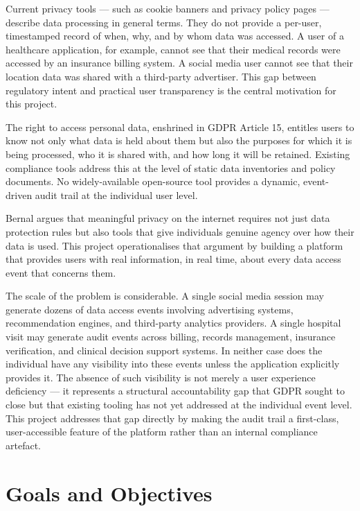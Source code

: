 \documentclass[a4paper,12pt,onecolumn]{report}
\begin{document}
Current privacy tools --- such as cookie banners and privacy policy pages --- describe data processing in general terms.
They do not provide a per-user, timestamped record of when, why, and by whom data was accessed.
A user of a healthcare application, for example, cannot see that their medical records were accessed by an insurance billing system.
A social media user cannot see that their location data was shared with a third-party advertiser.
This gap between regulatory intent and practical user transparency is the central motivation for this project.

The right to access personal data, enshrined in GDPR Article 15, entitles users to know not only what data is held about them but also the purposes for which it is being processed, who it is shared with, and how long it will be retained.
Existing compliance tools address this at the level of static data inventories and policy documents.
No widely-available open-source tool provides a dynamic, event-driven audit trail at the individual user level.

Bernal \cite{privacylaw} argues that meaningful privacy on the internet requires not just data protection rules but also tools that give individuals genuine agency over how their data is used.
This project operationalises that argument by building a platform that provides users with real information, in real time, about every data access event that concerns them.

The scale of the problem is considerable.
A single social media session may generate dozens of data access events involving advertising systems, recommendation engines, and third-party analytics providers.
A single hospital visit may generate audit events across billing, records management, insurance verification, and clinical decision support systems.
In neither case does the individual have any visibility into these events unless the application explicitly provides it.
The absence of such visibility is not merely a user experience deficiency --- it represents a structural accountability gap that GDPR sought to close but that existing tooling has not yet addressed at the individual event level.
This project addresses that gap directly by making the audit trail a first-class, user-accessible feature of the platform rather than an internal compliance artefact.

\section{Goals and Objectives}
\end{document}
